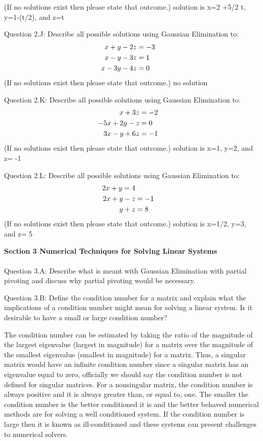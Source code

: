 \documentclass{article}
\begin{document}
(If no solutions exist then please state that outcome.) {\color{teal} solution is x=2 +5/2 t, y=1-(t/2), and z=t}
\par \medskip \noindent 
%
Question 2.J: Describe all possible solutions using Gaussian Elimination to:
\begin{align*}
     x + y - 2z &= -3 \cr 
    x - y -3z  &= 1 \cr
    x - 3y -4 z  &= 0 
\end{align*}
(If no solutions exist then please state that outcome.) {\color{teal} no solution}
\par \medskip \noindent 
%
Question 2.K: Describe all possible solutions using Gaussian Elimination to:
\begin{align*}
     x + 3z &= -2 \cr 
    -5 x + 2y - z  &= 0 \cr
    3x - y + 6z  &= -1 
\end{align*}
(If no solutions exist then please state that outcome.) {\color{teal} solution is x=1, y=2, and z= -1}
\par \medskip \noindent 
Question 2.L: Describe all possible solutions using Gaussian Elimination to:
\begin{align*}
     2x + y = 4 \cr 
    2 x + y - z  &= -1 \cr
    y + z  &= 8 
\end{align*}
(If no solutions exist then please state that outcome.) {\color{teal} solution is x=1/2, y=3, and z= 5}
\par \bigskip \noindent 
%
{\bf Section 3 Numerical Techniques for Solving Linear Systems}\\
\\
%
Question 3.A:  Describe what is meant with Gaussian Elimination with partial pivoting and discuss why partial pivoting would be necessary. 
\par \medskip \noindent 
%
Question 3.B:  Define the condition number for a matrix and explain what the implications of a condition number might mean for solving a linear system.  Is it desirable to have a small or large condition number?\par
{\color{teal} The condition number can be estimated by taking the ratio of the magnitude of the largest eigenvalue (largest in magnitude) for a matrix over the magnitude of the smallest eigenvalue (smallest in magnitude) for a matrix. Thus, a singular matrix would have an infinite condition number since a singular matrix has an eigenvalue equal to zero, officially we should say the condition number is not defined for singular matrices. For a nonsingular matrix, the condition number is always positive and it is always greater than, or equal to, one. The smaller the condition number is the better conditioned it is and the better behaved numerical methods are for solving a well conditioned system. If the condition number is large then it is known as ill-conditioned and these systems can present challenges to numerical solvers. }
\end{document}
